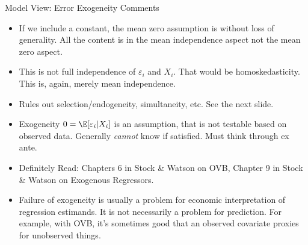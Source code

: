 \documentclass[aspectratio=169, handout]{beamer}
\begin{document}
{\footnotesize
\begin{frame}{Model View: Error Exogeneity}
Comments
\begin{itemize}
  \item If we include a constant, the mean zero assumption is without
    loss of generality. All the content is in the mean
    \alert{independence} aspect not the mean \alert{zero} aspect.

  \item This is not full independence of $\varepsilon_i$ and $X_i$.
    That would be homoskedasticity. This is, again, merely \alert{mean}
    independence.

  \item Rules out selection/endogeneity,
    simultaneity, etc. See the next slide.

  \item Exogeneity $0=\E[\varepsilon_i|X_i]$ is an \alert{assumption},
    that is \alert{not} testable based on observed data.
    Generally \emph{cannot} know if satisfied.
    Must think through \alert{ex ante}.

  \item \alert{Definitely Read}: Chapters 6 in Stock \& Watson on
    OVB, Chapter 9 in Stock \& Watson on Exogenous Regressors.

  \item Failure of exogeneity is usually a problem for
    \alert{economic interpretation} of regression estimands.
    It is not necessarily a problem for \alert{prediction}.
    For example, with OVB, it's sometimes good that an observed
    covariate proxies for unobserved things.
\end{itemize}
\end{frame}
}
\end{document}
